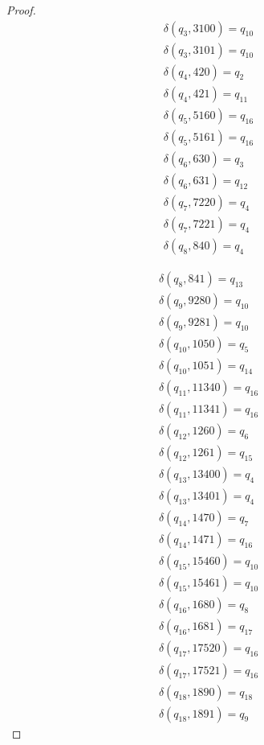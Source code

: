 \documentclass{jams-l}
\theoremstyle{definition}
\theoremstyle{remark}
\numberwithin{equation}{section}
\begin{document}
\begin{proof}
\begin{minipage}[b]{.45\textwidth}
\begin{align}
				\delta(q_{3}, 3100) = q_{10}\\
				\delta(q_{3}, 3101) = q_{10}\\
				\delta(q_{4}, 420) = q_{2}\\
				\delta(q_{4}, 421) = q_{11}\\
				\delta(q_{5}, 5160) = q_{16}\\
				\delta(q_{5}, 5161) = q_{16}\\
				\delta(q_{6}, 630) = q_{3}\\
				\delta(q_{6}, 631) = q_{12}\\
				\delta(q_{7}, 7220) = q_{4}\\
				\delta(q_{7}, 7221) = q_{4}\\
				\delta(q_{8}, 840) = q_{4}
			\end{align}
		\end{minipage}
		\quad\quad
		\begin{minipage}[b]{.45\textwidth}
			\begin{align}
				\delta(q_{8}, 841) = q_{13}\\
				\delta(q_{9}, 9280) = q_{10}\\
				\delta(q_{9}, 9281) = q_{10}\\
				\delta(q_{10}, 1050) = q_{5}\\
				\delta(q_{10}, 1051) = q_{14}\\
				\delta(q_{11}, 11340) = q_{16}\\
				\delta(q_{11}, 11341) = q_{16}\\
				\delta(q_{12}, 1260) = q_{6}\\
				\delta(q_{12}, 1261) = q_{15}\\
				\delta(q_{13}, 13400) = q_{4}\\
				\delta(q_{13}, 13401) = q_{4}\\
				\delta(q_{14}, 1470) = q_{7}\\
				\delta(q_{14}, 1471) = q_{16}\\
				\delta(q_{15}, 15460) = q_{10}\\
				\delta(q_{15}, 15461) = q_{10}\\
				\delta(q_{16}, 1680) = q_{8}\\
				\delta(q_{16}, 1681) = q_{17}\\
				\delta(q_{17}, 17520) = q_{16}\\
				\delta(q_{17}, 17521) = q_{16}\\
				\delta(q_{18}, 1890) = q_{18}\\
				\delta(q_{18}, 1891) = q_{9}
				\end{align}

\end{minipage}
\end{proof}
\end{document}
